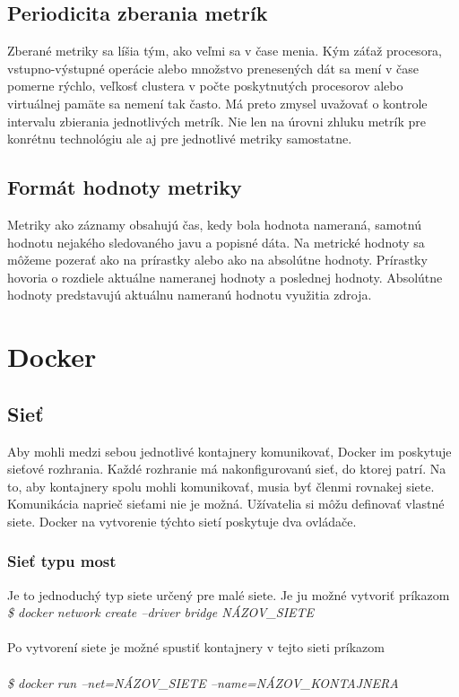 \documentclass[11pt,final,oneside]{fithesis}
\begin{document}
\subsection{Periodicita zberania metrík}
Zberané metriky sa líšia tým, ako veľmi sa v čase menia. Kým záťaž procesora, vstupno-výstupné operácie alebo množstvo prenesených dát sa mení v čase pomerne rýchlo, veľkosť clustera v počte poskytnutých procesorov 
alebo virtuálnej pamäte sa nemení tak často. Má preto zmysel uvažovať o kontrole intervalu zbierania jednotlivých metrík. Nie len 
na úrovni zhluku metrík pre konrétnu technológiu ale aj pre jednotlivé metriky samostatne.

\subsection{Formát hodnoty metriky}
Metriky ako záznamy obsahujú čas, kedy bola hodnota nameraná, samotnú hodnotu nejakého sledovaného javu a popisné dáta. Na metrické
hodnoty sa môžeme pozerať ako na prírastky alebo ako na absolútne hodnoty. Prírastky hovoria o rozdiele aktuálne nameranej hodnoty 
a poslednej hodnoty. Absolútne hodnoty predstavujú aktuálnu nameranú hodnotu využitia zdroja. 

\section{Docker}
\subsection{Sieť}
Aby mohli medzi sebou jednotlivé kontajnery komunikovať, Docker im poskytuje sieťové rozhrania. Každé rozhranie má nakonfigurovanú sieť,
do ktorej patrí. Na to, aby kontajnery spolu mohli komunikovať, musia byť členmi rovnakej siete. Komunikácia naprieč sieťami nie je možná.
Užívatelia si môžu definovať vlastné siete. Docker na vytvorenie týchto sietí poskytuje dva ovládače.

\subsubsection{Sieť typu most}
Je to jednoduchý typ siete určený pre malé siete. Je ju možné vytvoriť príkazom 
\\
{\em \$ docker network create --driver bridge NÁZOV\_SIETE}
\\ \\
Po vytvorení siete je možné spustiť kontajnery v tejto sieti príkazom
\\ \\
{\em \$ docker run --net=NÁZOV\_SIETE --name=NÁZOV\_KONTAJNERA}
\end{document}
